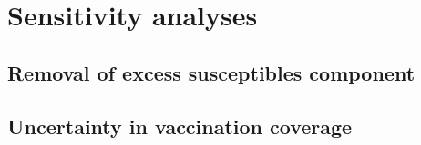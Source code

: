 \appendix

\section{Sensitivity analyses}

\subsection*{Removal of excess susceptibles component}

\subsection*{Uncertainty in vaccination coverage}